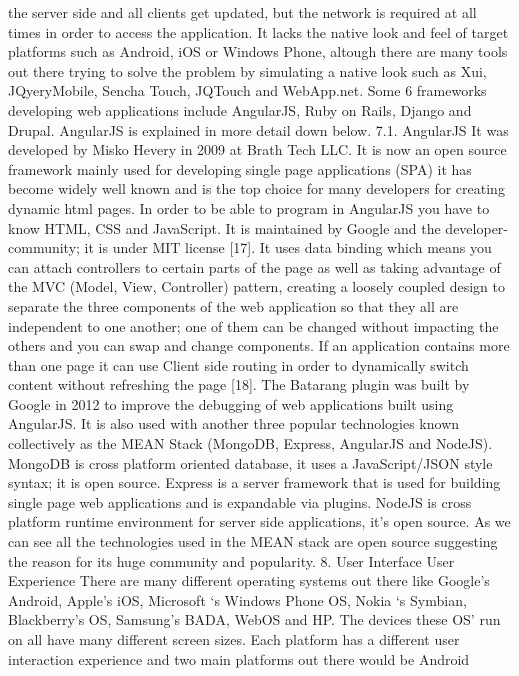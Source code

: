 the server side and all clients get updated, but the network is required at all
times in order to access the application. It lacks the native look and feel of
target platforms such as Android, iOS or Windows Phone, altough there are
many tools out there trying to solve the problem by simulating a native look
such as Xui, JQyeryMobile, Sencha Touch, JQTouch and WebApp.net. Some
6
frameworks developing web applications include AngularJS, Ruby on Rails,
Django and Drupal. AngularJS is explained in more detail down below.
7.1. AngularJS
It was developed by Misko Hevery in 2009 at Brath Tech LLC. It is now an
open source framework mainly used for developing single page applications
(SPA) it has become widely well known and is the top choice for many
developers for creating dynamic html pages. In order to be able to program
in AngularJS you have to know HTML, CSS and JavaScript. It is maintained by
Google and the developer-community; it is under MIT license [17]. It uses
data binding which means you can attach controllers to certain parts of the
page as well as taking advantage of the MVC (Model, View, Controller)
pattern, creating a loosely coupled design to separate the three components
of the web application so that they all are independent to one another; one of
them can be changed without impacting the others and you can swap and
change components. If an application contains more than one page it can use
Client side routing in order to dynamically switch content without refreshing
the page [18]. The Batarang plugin was built by Google in 2012 to improve
the debugging of web applications built using AngularJS. It is also used with
another three popular technologies known collectively as the MEAN Stack
(MongoDB, Express, AngularJS and NodeJS). MongoDB is cross platform
oriented database, it uses a JavaScript/JSON style syntax; it is open source.
Express is a server framework that is used for building single page web
applications and is expandable via plugins. NodeJS is cross platform runtime
environment for server side applications, it’s open source. As we can see all
the technologies used in the MEAN stack are open source suggesting the
reason for its huge community and popularity.
8. User Interface User Experience
There are many different operating systems out there like Google’s
Android, Apple’s iOS, Microsoft ‘s Windows Phone OS, Nokia ‘s Symbian,
Blackberry’s OS, Samsung’s BADA, WebOS and HP. The devices these OS’ run
on all have many different screen sizes. Each platform has a different user
interaction experience and two main platforms out there would be Android

